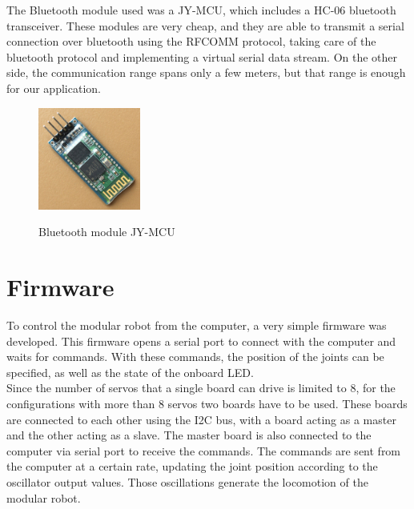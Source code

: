 The Bluetooth module used was a JY-MCU, which includes a HC-06 bluetooth transceiver. These modules are very cheap, and they are able to transmit a serial connection over bluetooth using the RFCOMM protocol, taking care of the bluetooth protocol and implementing a virtual serial data stream. On the other side, the communication range spans only a few meters, but that range is enough for our application.\\

\begin{figure}[h]
		\centering
        \includegraphics[width=0.3\textwidth]{images/Hardware_jy-mcu.jpg}\\
        \caption{Bluetooth module JY-MCU}
        \label{fig:hardware_bluetooth}
\end{figure} 



\section{Firmware}
\label{hardware_firmware}

To control the modular robot from the computer, a very simple firmware was developed. This firmware opens a serial port to connect with the computer and waits for commands. With these commands, the position of the joints can be specified, as well as the state of the onboard LED.\\

Since the number of servos that a single board can drive is limited to 8, for the configurations with more than 8 servos two boards have to be used. These boards are connected to each other using the I2C bus, with a board acting as a master and the other acting as a slave. The master board is also connected to the computer via serial port to receive the commands. The commands are sent from the computer at a certain rate, updating the joint position according to the oscillator output values. Those oscillations generate the locomotion of the modular robot.\\

